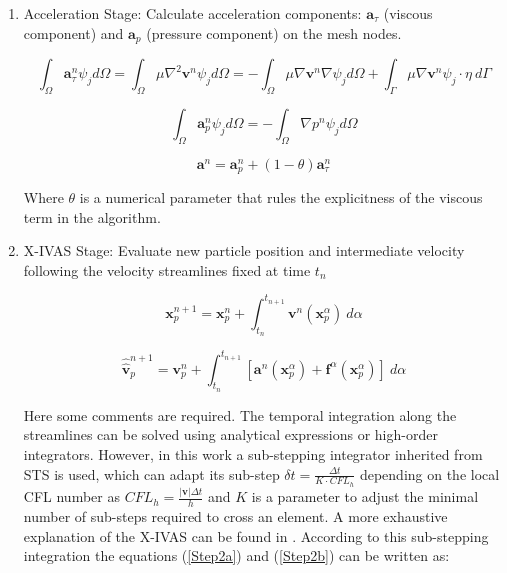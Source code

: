 \begin{enumerate}
  \item Acceleration Stage: Calculate acceleration components: $\mathbf{a}_{\tau}$ (viscous component) and $\mathbf{a}_{p}$ (pressure component) on the mesh nodes.


  \begin{equation}\label{Step1a}
\int_{\Omega}\mathbf{a}^{n}_{\tau}\psi_j d\Omega=\int_{\Omega}\mu \nabla^{2}\mathbf{v}^{n} \psi_j d\Omega=-\int_{\Omega}\mu \nabla\mathbf{v}^{n} \nabla \psi_j d\Omega + \int_{\Gamma}\mu \nabla\mathbf{v}^{n} \psi_j \cdot \eta \ d\Gamma
\end{equation}

\begin{equation}\label{Step1b}
\int_{\Omega}\mathbf{a}^{n}_{p}\psi_j d\Omega=-\int_{\Omega}\nabla p^{n} \psi_j d\Omega
\end{equation}

\begin{equation}\label{Step1c}
\mathbf{a}^{n}=\mathbf{a}^{n}_{p} + (1-\theta)\mathbf{a}^{n}_{\tau}
\end{equation}

Where $\theta$ is a numerical parameter that rules the explicitness of the viscous term in the algorithm.

  \item X-IVAS Stage: Evaluate new particle position and intermediate velocity following the velocity streamlines fixed at time $t_n$

  \begin{equation}\label{Step2a}
\mathbf{x}^{n+1}_{p}=\mathbf{x}^{n}_{p} + \int_{t_n}^{t_{n+1}} \mathbf{v}^{n}(\mathbf{x}_p^{\alpha}) \ d\alpha
\end{equation}

\begin{equation}\label{Step2b}
\displaystyle \widehat{\widehat{\mathbf{v}}}^{n+1}_{p}=\mathbf{v}^{n}_{p} +
\int_{t_n}^{t_{n+1}} \left[ \mathbf{a}^{n}(\mathbf{x}_p^{\alpha}) + \mathbf{f}^{\alpha} (\mathbf{x}_p^{\alpha}) \right]
 \ d\alpha
\end{equation}

Here some comments are required. The temporal integration along the streamlines can be solved using analytical expressions\cite{Idelsohn12} or high-order integrators\cite{Nair2003275}. However, in this work a sub-stepping integrator inherited from STS\cite{Alexiades96} is used, which can adapt its sub-step $\delta t=\frac{\Delta t}{K\cdot CFL_h}$ depending on the local CFL number as $CFL_h=\frac{|\mathbf{v}|\Delta t}{h}$ and $K$ is a parameter to adjust the minimal number of sub-steps required to cross an element. A more exhaustive explanation of the X-IVAS can be found in \cite{Nigro11}. According to this sub-stepping integration the equations (\ref{Step2a}) and (\ref{Step2b}) can be written as:


\end{enumerate}
